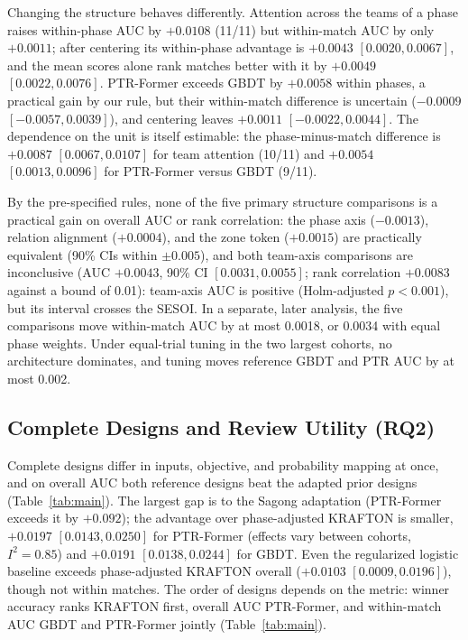 \documentclass[sigconf,anonymous]{acmart}
\begin{document}
Changing the structure behaves differently. Attention across the teams of a phase raises within-phase AUC by $+0.0108$ (11/11) but within-match AUC by only $+0.0011$; after centering its within-phase advantage is $+0.0043$ $[0.0020,\allowbreak 0.0067]$, and the mean scores alone rank matches better with it by $+0.0049$ $[0.0022,\allowbreak 0.0076]$. PTR-Former exceeds GBDT by $+0.0058$ within phases, a practical gain by our rule, but their within-match difference is uncertain ($-0.0009$ $[-0.0057,\allowbreak 0.0039]$), and centering leaves $+0.0011$ $[-0.0022,\allowbreak 0.0044]$. The dependence on the unit is itself estimable: the phase-minus-match difference is $+0.0087$ $[0.0067,\allowbreak 0.0107]$ for team attention (10/11) and $+0.0054$ $[0.0013,\allowbreak 0.0096]$ for PTR-Former versus GBDT (9/11).

By the pre-specified rules, none of the five primary structure comparisons is a practical gain on overall AUC or rank correlation: the phase axis ($-0.0013$), relation alignment ($+0.0004$), and the zone token ($+0.0015$) are practically equivalent (90\% CIs within $\pm0.005$), and both team-axis comparisons are inconclusive (AUC $+0.0043$, 90\% CI $[0.0031,\allowbreak 0.0055]$; rank correlation $+0.0083$ against a bound of 0.01): team-axis AUC is positive (Holm-adjusted $p<0.001$), but its interval crosses the SESOI. In a separate, later analysis, the five comparisons move within-match AUC by at most 0.0018, or 0.0034 with equal phase weights. Under equal-trial tuning in the two largest cohorts, no architecture dominates, and tuning moves reference GBDT and PTR AUC by at most 0.002.

\subsection{Complete Designs and Review Utility (RQ2)}
\label{sec:results:designs}

Complete designs differ in inputs, objective, and probability mapping at once, and on overall AUC both reference designs beat the adapted prior designs (Table~\ref{tab:main}). The largest gap is to the Sagong adaptation (PTR-Former exceeds it by $+0.092$); the advantage over phase-adjusted KRAFTON is smaller, $+0.0197$ $[0.0143,\allowbreak 0.0250]$ for PTR-Former (effects vary between cohorts, $I^2=0.85$) and $+0.0191$ $[0.0138,\allowbreak 0.0244]$ for GBDT. Even the regularized logistic baseline exceeds phase-adjusted KRAFTON overall ($+0.0103$ $[0.0009,\allowbreak 0.0196]$), though not within matches. The order of designs depends on the metric: winner accuracy ranks KRAFTON first, overall AUC PTR-Former, and within-match AUC GBDT and PTR-Former jointly (Table~\ref{tab:main}).
\end{document}
